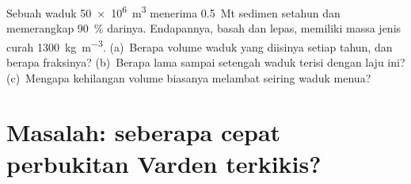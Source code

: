 \begin{exercise}[$\star\star\star$]\label{exo:b1:erosion-transport:12}
Sebuah waduk \qty{50e6}{m^3} menerima \qty{0.5}{Mt} sedimen setahun dan memerangkap \qty{90}{\percent} darinya. Endapannya, basah dan lepas, memiliki massa jenis curah
\qty{1300}{kg.m^{-3}}. (a)~Berapa volume waduk yang diisinya setiap tahun, dan berapa fraksinya? (b)~Berapa lama sampai setengah waduk terisi dengan laju ini? (c)~Mengapa kehilangan volume biasanya melambat seiring waduk menua?
\end{exercise}

\section{Masalah: seberapa cepat perbukitan Varden terkikis?}

